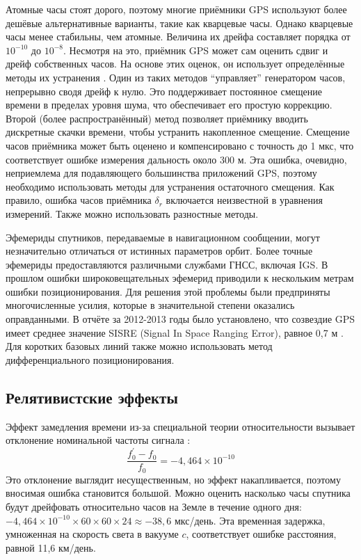 Атомные часы стоят дорого, поэтому многие приёмники GPS используют более дешёвые альтернативные варианты, такие как кварцевые часы.
Однако кварцевые часы менее стабильны, чем атомные.
Величина их дрейфа составляет порядка от $10^{-10}$ до $10^{-8}$. 
Несмотря на это, приёмник GPS может сам оценить сдвиг и дрейф собственных часов.
На основе этих оценок, он использует определённые методы их устранения \cite{Petovello2011}. 
Один из таких методов ``управляет'' генератором часов, непрерывно сводя дрейф к нулю.
Это поддерживает постоянное смещение времени в пределах уровня шума, что обеспечивает его простую коррекцию.  
Второй (более распространённый) метод позволяет приёмнику вводить дискретные скачки времени, чтобы устранить накопленное смещение.
Смещение часов приёмника может быть оценено и компенсировано с точность до 1 мкс, что соответствует ошибке измерения дальность около 300 м. 
Эта ошибка, очевидно, неприемлема для подавляющего большинства приложений GPS, поэтому необходимо использовать методы для устранения остаточного смещения.
Как правило, ошибка часов приёмника $\delta_r$ включается неизвестной в уравнения измерений.
Также можно использовать разностные методы.

Эфемериды спутников, передаваемые в навигационном сообщении, могут незначительно отличаться от истинных параметров орбит.
Более точные эфемериды предоставляются различными службами ГНСС, включая IGS.
В прошлом ошибки широковещательных эфемерид приводили к нескольким метрам ошибки позиционирования.
Для решения этой проблемы были предприняты многочисленные усилия, которые в значительной степени оказались оправданными.
В отчёте за 2012-2013 годы было установлено, что созвездие GPS имеет среднее значение SISRE (Signal In Space Ranging Error), равное 0,7 м \cite{Montebruck2015}.  
Для коротких базовых линий также можно использовать метод дифференциального позиционирования.

\subsection*{\textbf{Релятивистские эффекты}}

Эффект замедления времени из-за специальной теории относительности вызывает отклонение номинальной частоты сигнала \cite{Hofmann2008}:
\begin{equation}
\frac{f_0^{'}-f_0}{f_0}=-4,464\times10^{-10}    
\end{equation}
Это отклонение выглядит несущественным, но эффект накапливается, поэтому вносимая ошибка становится большой.
Можно оценить насколько часы спутника будут дрейфовать относительно часов на Земле в течение одного дня: $-4,464\times10^{-10}\times60\times60\times24\approx-38,6$ мкс/день.
Эта временная задержка, умноженная на скорость света в вакууме $c$, соответствует ошибке расстояния, равной 11,6 км/день. 

